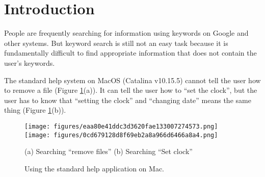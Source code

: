 \documentclass[manuscript,anonymous,review]{acmart}
\begin{document}



\maketitle

\section{Introduction}

People are frequently searching for information using keywords on Google
and other systems.
But keyword search is still not an easy task because it is
fundamentally difficult to find appropriate information that does not
contain the user's keywords.


The standard help system on MacOS (Catalina v10.15.5)
cannot tell the user how to remove a file (Figure \ref{machelp}(a)).
%
It can tell the user how to ``set the clock'', but
the user has to know that
``setting the clock'' and ``changing date'' means the same thing (Figure \ref{machelp}(b)).

\begin{figure}[H]
  \texttt{[image: figures/eaa80e41ddc3d3620fae133007274573.png]}
  \texttt{[image: figures/0cd679128d8f69eb2a8a966d6466a8a4.png]}
  \par
  (a) Searching ``remove files'' \hspace{3cm} (b) Searching ``Set clock''
  \caption{Using the standard help application on Mac.}
  \label{machelp}
\end{figure}
\end{document}
